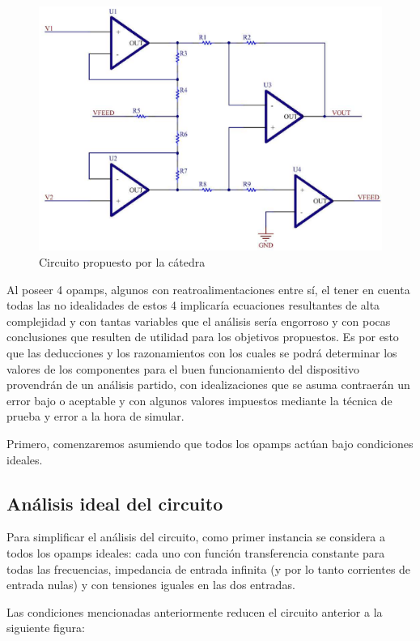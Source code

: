 \documentclass[../../tc_tp3_main.tex]{subfiles}
\begin{document}
	\begin{figure}[H]	
		\centering
		\includegraphics[scale=0.4]{imagenes/diseno_circuito.png}
		\caption{Circuito propuesto por la cátedra}
		\label{fig:ej3_diseno_circuito}
	\end{figure}
	
Al poseer 4 opamps, algunos con reatroalimentaciones entre sí, el tener en cuenta todas las no idealidades de estos 4 implicaría ecuaciones resultantes de alta complejidad y con tantas variables que el análisis sería engorroso y con pocas conclusiones que resulten de utilidad para los objetivos propuestos. Es por esto que las deducciones y los razonamientos con los cuales se podrá determinar los valores de los componentes para el buen funcionamiento del dispositivo provendrán de un análisis partido, con idealizaciones que se asuma contraerán un error bajo o aceptable y con algunos valores impuestos mediante la técnica de prueba y error a la hora de simular. \par
Primero, comenzaremos asumiendo que todos los opamps actúan bajo condiciones ideales.\par
	
\subsection{Análisis ideal del circuito}

Para simplificar el análisis del circuito, como primer instancia se considera a todos los opamps ideales: cada uno con función transferencia constante para todas las frecuencias, impedancia de entrada infinita (y por lo tanto corrientes de entrada nulas)  y con tensiones iguales en las dos entradas.\par
Las condiciones mencionadas anteriormente reducen el circuito anterior a la siguiente figura: \par
\end{document}
